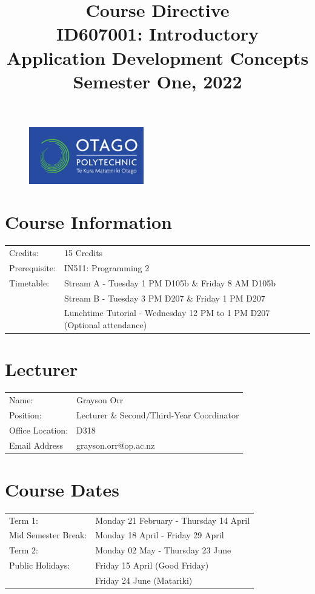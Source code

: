 \documentclass{article}
\author{}
\begin{document}
 

\begin{figure}
	\includegraphics[width=50mm]{../img/logo.png} 
\end{figure}

\title{Course Directive\\ID607001: Introductory Application Development Concepts\\Semester One, 2022}
\date{}
\maketitle

\section*{Course Information}
\begin{tabular}{ll}
	Credits:            & 15 Credits                             \\
	Prerequisite:       & IN511: Programming 2                   \\
	Timetable:  & Stream A - Tuesday 1 PM D105b \& Friday 8 AM D105b  \\    
	  			& Stream B - Tuesday 3 PM D207 \& Friday 1 PM D207  \\ 
				& Lunchtime Tutorial - Wednesday 12 PM to 1 PM D207 (Optional attendance)
\end{tabular} 

\section*{Lecturer}
\begin{tabular}{ll}
	Name:            & Grayson Orr                            \\
	Position:       & Lecturer \& Second/Third-Year Coordinator                   \\
	Office Location:  & D318  \\    
	Email Address  & grayson.orr@op.ac.nz  \\   
\end{tabular}

\section*{Course Dates}
\begin{tabular}{ll} 
	Term 1:             & Monday 21 February - Thursday 14 April  \\
	Mid Semester Break: & Monday 18 April - Friday 29 April    \\
	Term 2:             & Monday 02 May - Thursday 23 June    \\
	Public Holidays:   & Friday 15 April (Good Friday) \\
	& Friday 24 June (Matariki)
\end{tabular}
\end{document}
